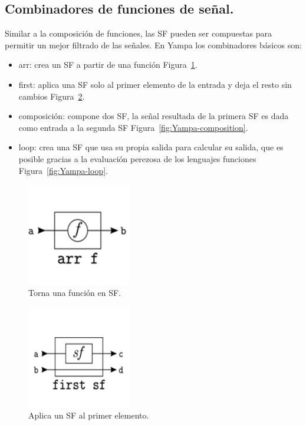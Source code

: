 \subsection{Combinadores de funciones de señal.}

Similar a la composición de funciones, las SF pueden ser compuestas para permitir un mejor filtrado de las señales. En Yampa los combinadores básicos son:

\begin{itemize}
\item arr: crea un SF a partir de una función Figura~\ref{fig:Yampa-arr}.
\item first: aplica una SF solo al primer elemento de la entrada y deja el resto sin cambios Figura~\ref{fig:Yampa-first}.
\item composición: compone dos SF, la señal resultada de la primera SF es dada como entrada a la segunda SF Figura~\ref{fig:Yampa-composition}.
\item loop: crea una SF que usa su propia salida para calcular su salida, que es posible gracias a la evaluación perezosa de los lenguajes funciones Figura~\ref{fig:Yampa-loop}.
\end{itemize}


\begin{figure}[htbp!]
\centering
\includegraphics[width=0.4\textwidth]{Yampa-arr}
\caption[Yampa-arr]{Torna una función en SF.}
\label{fig:Yampa-arr}
\end{figure}

\begin{figure}[htbp!]
\centering
\includegraphics[width=0.4\textwidth]{Yampa-first}
\caption[Yampa-first]{Aplica un SF al primer elemento.}
\label{fig:Yampa-first}
\end{figure}

